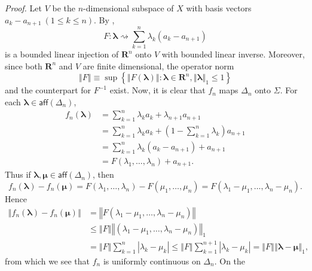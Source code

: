 \documentclass[11pt]{article}%
\newenvironment{proof}[1][Proof]{\noindent\textit{#1.} }{}
\begin{document}
\begin{proof}
Let $V$ be the $n$-dimensional subspace of $X$ with basis vectors
$a_{k}-a_{n+1}\ (1\leq k\leq n)$. By \cite[4.1.4]{BVtech},%
\[
F:\mathbf{\lambda}\rightsquigarrow\sum_{k=1}^{n}\lambda_{k}\left(
a_{k}-a_{n+1}\right)
\]
is a bounded linear injection of $\mathbf{R}^{n}$ onto $V$ with bounded linear
inverse. Moreover, since both $\mathbf{R}^{n}$ and $V$ are finite dimensional,
the operator norm%
\[
\left\Vert F\right\Vert \equiv\sup\left\{  \left\Vert F(\mathbf{\lambda
})\right\Vert :\mathbf{\lambda}\in\mathbf{R}^{n},\left\Vert \mathbf{\lambda
}\right\Vert _{1}\leq1\right\}
\]
and the counterpart for $F^{-1}$ exist. Now, it is clear that $f_{n}$ maps
$\Delta_{n}$ onto $\Sigma$. For each $\mathbf{\lambda}\in\mathsf{aff}%
(\Delta_{n})$,%
\begin{align*}
f_{n}(\mathbf{\lambda})  &  =%
{\textstyle\sum_{k=1}^{n}}
\lambda_{k}a_{k}+\lambda_{n+1}a_{n+1}\\
&  =%
{\textstyle\sum_{k=1}^{n}}
\lambda_{k}a_{k}+\left(  1-%
{\textstyle\sum_{k=1}^{n}}
\lambda_{k}\right)  a_{n+1}\\
&  =%
{\textstyle\sum_{k=1}^{n}}
\lambda_{k}(a_{k}-a_{n+1})+a_{n+1}\\
&  =F(\lambda_{1},\ldots,\lambda_{n})+a_{n+1}.
\end{align*}
Thus if $\mathbf{\lambda},\mathbf{\mu}\in\mathsf{aff}(\Delta_{n})$, then%
\[
f_{n}(\mathbf{\lambda})-f_{n}(\mathbf{\mu})=F(\lambda_{1},\ldots,\lambda
_{n})-F(\mu_{1},\ldots,\mu_{n})=F(\lambda_{1}-\mu_{1},\ldots,\lambda_{n}%
-\mu_{n}).
\]
Hence%
\begin{align*}
\left\Vert f_{n}(\mathbf{\lambda})-f_{n}(\mathbf{\mu})\right\Vert  &
=\left\Vert F(\lambda_{1}-\mu_{1},\ldots,\lambda_{n}-\mu_{n})\right\Vert \\
&  \leq\left\Vert F\right\Vert \left\Vert (\lambda_{1}-\mu_{1},\ldots
,\lambda_{n}-\mu_{n})\right\Vert _{1}\\
&  =\left\Vert F\right\Vert \sum_{k=1}^{n}\left\vert \lambda_{k}-\mu
_{k}\right\vert \leq\left\Vert F\right\Vert \sum_{k=1}^{n+1}\left\vert
\lambda_{k}-\mu_{k}\right\vert =\left\Vert F\right\Vert \left\Vert
\mathbf{\lambda}-\mathbf{\mu}\right\Vert _{1},
\end{align*}
from which we see that $f_{n}$ is uniformly continuous on $\Delta_{n}$. On the

\end{proof}
\end{document}
